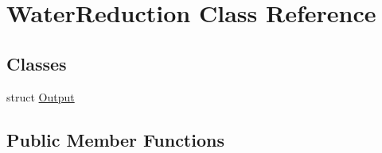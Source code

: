 \hypertarget{class_water_reduction}{}\section{Water\+Reduction Class Reference}
\label{class_water_reduction}
\subsection*{Classes}
\begin{DoxyCompactItemize}
\item 
struct \hyperlink{struct_water_reduction_1_1_output}{Output}
\end{DoxyCompactItemize}
\subsection*{Public Member Functions}
